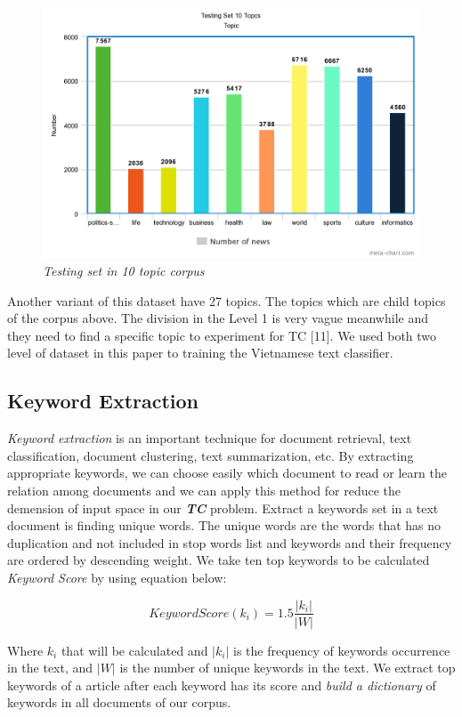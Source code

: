 \documentclass[conference]{IEEEtran}
\newcommand\abs[1]{\left|#1\right|}
\begin{document}
\begin{figure}[h]
\includegraphics[scale=0.2]{testing_10.png}
\centering
\caption{\textit{Testing set in 10 topic corpus}}
\end{figure}

Another variant of this dataset have 27 topics. The topics which are child topics of the corpus above. 
The division in the Level 1 is very vague meanwhile and they need to find a specific topic to experiment for TC [11]. We used both two level of dataset in this paper to training the Vietnamese text classifier.
\subsection{Keyword Extraction}
\textit{Keyword extraction} is an important technique for document
retrieval, text classification, document clustering, text summarization, etc. By extracting appropriate keywords, we can choose easily which document to read or learn the relation among documents and we can apply this method for reduce the demension of input space in our \textit{\textbf{TC}} problem. Extract a keywords set in a text document is finding unique words. The unique words are the words that
has no duplication and not included in stop words list and keywords and their frequency are ordered
by descending weight. We take ten top keywords to be calculated \textit{Keyword Score} by using equation below:

\begin{equation}
KeywordScore(k_i)=1.5 \frac{\abs{k_i}}{\abs{W}}
\end{equation}

Where $k_i$ that will be calculated and $\abs{k_i}$ is the frequency of keywords occurrence in the text, and $\abs{W}$ is the number of unique keywords in the text. We extract top keywords of a article after each keyword has its score and \textit{build a dictionary} of keywords in all documents of our corpus. 
\end{document}

